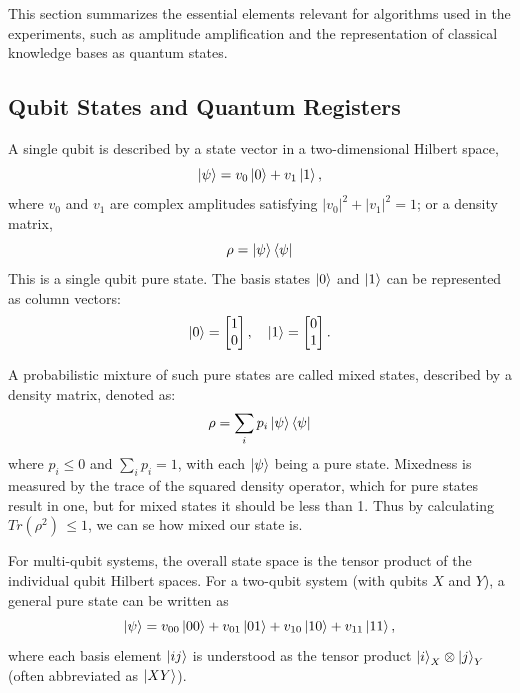 \documentclass[encoding=utf8,british]{tumphthesis}
\begin{document}
    This section summarizes the essential elements relevant for algorithms used in the experiments, such as amplitude amplification and the representation of classical knowledge bases as quantum states.

        \subsection{Qubit States and Quantum Registers}
        A single qubit is described by a state vector in a two-dimensional Hilbert space,
        \begin{equation}
            \left|\psi\right> = v_0\left|0\right> + v_1\left|1\right>,
            \label{eq:single_qubit_pure}
        \end{equation}
        where $v_0$ and $v_1$ are complex amplitudes satisfying $|v_0|^2 + |v_1|^2 = 1$; or a density matrix,
        \begin{equation*}
            \rho = \left|\psi\right>\left<\psi\right|
        \end{equation*}
        This is a single qubit pure state. The basis states $\left|0\right>$ and $\left|1\right>$ can be 
        represented as column vectors:
        \begin{equation*}
            \left|0\right> = \begin{bmatrix}1 \\ 0\end{bmatrix}, \quad \left|1\right> = \begin{bmatrix}0 \\ 1\end{bmatrix}.
        \end{equation*}

        A probabilistic mixture of such pure states are called mixed states, described by a density matrix, denoted as:
        \begin{equation*}
            \rho = \sum_i p_i \left|\psi\right>\left<\psi\right|
        \end{equation*}
        where $p_i \leq 0$ and $\sum_i p_i = 1$, with each $\left|\psi\right>$ being a pure state. Mixedness is measured by the trace of the squared density operator,
        which for pure states result in one, but for mixed states it should be less than 1. Thus by calculating $Tr(\rho^2) \, \leq 1$, we can se how mixed our state is.   

        For multi-qubit systems, the overall state space is the tensor product of the individual qubit Hilbert spaces. For a two-qubit system (with qubits $X$ and $Y$), a general pure state can be written as
        \begin{equation*}
            \left|\psi\right> = v_{00}\left|00\right> + v_{01}\left|01\right> + v_{10}\left|10\right> + v_{11}\left|11\right>,
        \end{equation*}
        where each basis element $\left|ij\right>$ is understood as the tensor product $\left|i\right>_X \otimes \left|j\right>_Y$ (often abbreviated as $\left|XY\right>$).
\end{document}

